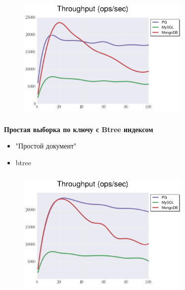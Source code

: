 \documentclass[usenames,dvipsnames, 18pt, compress, aspectratio=169]{beamer}
\begin{document}
\begin{frame}
    \frametitle{}
    \begin{center}
    \begin{figure}
        \includegraphics[width=0.75\textwidth,center]{benchmarks/select_jsonb_path_ops_no_parse_throughput.png}
    \end{figure}
    \end{center}
\end{frame}

\begin{frame}
    \frametitle{}
    \begin{center}
        \textbf{Простая выборка по ключу с Btree индексом}
        \begin{itemize}[label={}]
            \item "Простой документ"
            \item btree
        \end{itemize}
    \end{center}
\end{frame}

\begin{frame}
    \frametitle{}
    \begin{center}
    \begin{figure}
        \includegraphics[width=0.75\textwidth,center]{benchmarks/select_btree_throughput.png}
    \end{figure}
    \end{center}
\end{frame}
\end{document}
